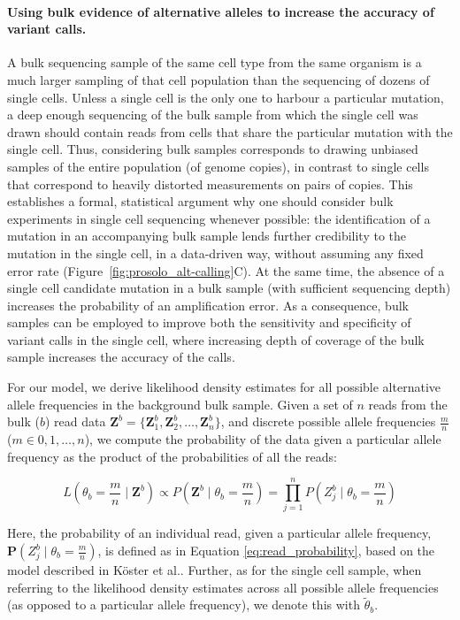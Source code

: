 \documentclass[12pt,inline]{wlscirep}
\newcommand{\Prob}{{\mathbf{P}}}
\begin{document}
\paragraph{Using bulk evidence of alternative alleles to increase the accuracy of variant calls.}
A bulk sequencing sample of the same cell type from the same organism is a much larger sampling of that cell population than the sequencing of dozens of single cells.
Unless a single cell is the only one to harbour a particular mutation, a deep enough sequencing of the bulk sample from which the single cell was drawn should contain reads from cells that share the particular mutation with the single cell.
Thus, considering bulk samples corresponds to drawing unbiased samples of the entire population (of genome copies), in contrast to single cells that correspond to heavily distorted measurements on pairs of copies.
This establishes a formal, statistical argument why one should consider bulk experiments in single cell sequencing whenever possible: the identification of a mutation in an accompanying bulk sample lends further credibility to the mutation in the single cell, in a data-driven way, without assuming any fixed error rate (Figure~\ref{fig:prosolo_alt-calling}C).
At the same time, the absence of a single cell candidate mutation in a bulk sample (with sufficient sequencing depth) increases the probability of an amplification error.
As a consequence, bulk samples can be employed to improve both the sensitivity and specificity of variant calls in the single cell, where increasing depth of coverage of the bulk sample increases the accuracy of the calls. 

For our model, we derive likelihood density estimates for all possible alternative allele frequencies in the background bulk sample.
Given a set of $n$ reads from the bulk ($b$) read data $\boldsymbol{Z}^b  = \{ \boldsymbol{Z}_1^b, \boldsymbol{Z}_2^b, \dots, \boldsymbol{Z}_n^b \}$, and discrete possible allele frequencies $\frac{m}{n}$ ($m \in 0, 1, \dots, n$), we compute the probability of the data given a particular allele frequency as the product of the probabilities of all the reads:

\begin{equation}
 \label{eq:bulk-prob}
 L\left(\theta_b = \frac{m}{n} \mid \boldsymbol{Z}^b\right) \propto
 P\left(\boldsymbol{Z}^b \mid \theta_b = \frac{m}{n}\right) =
 \prod_{j=1}^n P\left(Z_j^b \mid \theta_b = \frac{m}{n} \right)
\end{equation}

Here, the probability of an individual read, given a particular allele frequency, $\Prob(Z_j^b \mid \theta_b = \frac{m}{n})$, is defined as in Equation \ref{eq:read_probability}, based on the model described in Köster et al.\cite{koster_varlociraptor_2020}.
Further, as for the single cell sample, when referring to the likelihood density estimates across all possible allele frequencies (as opposed to a particular allele frequency), we denote this with $\tilde{\theta}_b$.
\end{document}
